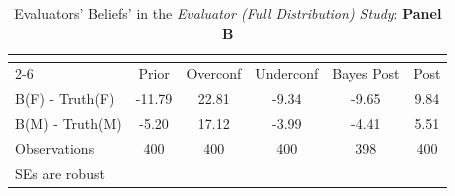 \begin{table}[htbp]\centering
\caption{Evaluators' Beliefs' in the \textit{Evaluator (Full Distribution) Study}: \textbf{Panel B}}
\begin{tabular}{l*{5}{c}}
\hline\hline
                &\multicolumn{5}{c}{}                             \\\cmidrule(lr){2-6}
                &\multicolumn{1}{c}{Prior}&\multicolumn{1}{c}{Overconf}&\multicolumn{1}{c}{Underconf}&\multicolumn{1}{c}{Bayes Post}&\multicolumn{1}{c}{Post}\\
\hline
B(F) - Truth(F) &   -11.79&    22.81&    -9.34&    -9.65&     9.84\\
B(M) - Truth(M) &    -5.20&    17.12&    -3.99&    -4.41&     5.51\\
\hline
Observations    &      400&      400&      400&      398&      400\\
\hline\hline
\multicolumn{6}{l}{\footnotesize SEs are robust}\\
\end{tabular}
\end{table}
